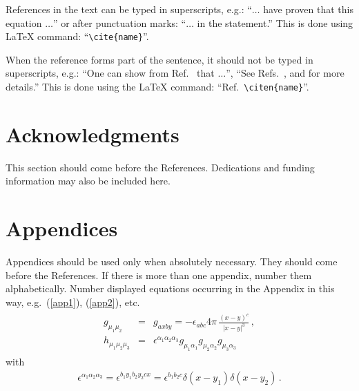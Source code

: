 \documentclass{ws-ijmpa}
\begin{document}
References in the text can be typed in superscripts,
e.g.: ``$\ldots$ have proven\cite{autbk,edbk,rvo} that
this equation $\ldots$'' or after punctuation marks:
``$\ldots$ in the statement.\cite{rvo}'' This is
done using LaTeX command: ``\verb|\cite{name}|''.

When the reference forms part of the sentence, it should not
be typed in superscripts, e.g.: ``One can show from
Ref.~ that $\ldots$'', ``See
Refs.~, 
and  for more details.''
This is done using the LaTeX
command: ``Ref.~\verb|\citen{name}|''.

\section*{Acknowledgments}

This section should come before the References. Dedications and funding
information may also be included here.

\appendix

\section{Appendices}

Appendices should be used only when absolutely necessary. They
should come before the References. If there is more than one
appendix, number them alphabetically. Number displayed equations
occurring in the Appendix in this way, e.g.~(\ref{app1}),\break
(\ref{app2}), etc.
\begin{eqnarray}	%
\begin{array}{rcl}
g_{\mu_1\mu_2} &=& g_{axby}=-\displaystyle{\epsilon_{abc}}{4\pi}\,
\frac{(x-y)^c}{|x-y|^3}\,, \\[8pt]
h_{\mu_1\mu_2\mu_3} &=& \epsilon^{\alpha_1 \alpha_2 \alpha_3}
g_{\mu_1\alpha_1}g_{\mu_2\alpha_2}g_{\mu_3\alpha_3}
\end{array}
\label{app1}
\end{eqnarray}
with
\begin{eqnarray}	%
\epsilon^{\alpha_1 \alpha_2 \alpha_3} = \epsilon^{b_1y_1b_2y_2cx} =
\epsilon^{b_1b_2c}\delta(x-y_1)\delta(x-y_2)\,.
\label{app2}
\end{eqnarray}
\end{document}
